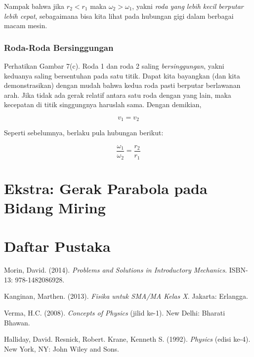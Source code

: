 \documentclass[12pt, a4paper]{article}\usepackage[utf8]{inputenc}
\theoremstyle{plain}
\theoremstyle{plain}
\numberwithin{equation}{section}
\theoremstyle{definition}
\begin{document}
	Nampak bahwa jika $r_2 < r_1$ maka $\omega_2 > \omega_1$, yakni \textit{roda yang lebih kecil berputar lebih cepat}, sebagaimana bisa kita lihat pada hubungan gigi dalam berbagai macam mesin.
	
	\subsubsection{Roda-Roda Bersinggungan}
	
	Perhatikan Gambar 7(c). Roda 1 dan roda 2 saling \textit{bersinggungan}, yakni keduanya saling bersentuhan pada satu titik. Dapat kita bayangkan (dan kita demonstrasikan) dengan mudah bahwa kedua roda pasti berputar berlawanan arah. Jika tidak ada gerak relatif antara satu roda dengan yang lain, maka kecepatan di titik singgungnya haruslah sama. Dengan demikian,
	
	\begin{equation}
		v_1 = v_2
	\end{equation}
	
	Seperti sebelumnya, berlaku pula hubungan berikut:
	
	\begin{equation}
		\frac{\omega_1}{\omega_2} = \frac{r_2}{r_1}
	\end{equation}
		
	\section{Ekstra: Gerak Parabola pada Bidang Miring}
	
	\pagebreak
	
	\section{Daftar Pustaka}
	
	\par Morin, David. (2014). \textit{Problems and Solutions in Introductory Mechanics}. ISBN-13: 978-1482086928.
	\par Kanginan, Marthen. (2013). \textit{Fisika untuk SMA/MA Kelas X}. Jakarta: Erlangga.
	\par Verma, H.C. (2008). \emph{Concepts of Physics} (jilid ke-1). New Delhi: Bharati Bhawan.
	\par Halliday, David. Resnick, Robert. Krane, Kenneth S. (1992). \textit{Physics} (edisi ke-4). New York, NY: John Wiley and Sons.
	
	\vspace{3em}
	
\end{document}
